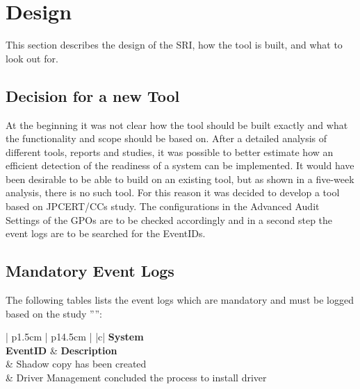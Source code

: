 \section{Design}
This section describes the design of the SRI, how the tool is built, and what to look out for.
\subsection{Decision for a new Tool}
At the beginning it was not clear how the tool should be built exactly and what the functionality and scope should be based on. After a detailed analysis of different tools, reports and studies, it was possible to better estimate how an efficient detection of the readiness of a system can be implemented. It would have been desirable to be able to build on an existing tool, but as shown in a five-week analysis, there is no such tool. For this reason it was decided to develop a tool based on JPCERT/CCs study. The configurations in the Advanced Audit Settings of the GPOs are to be checked accordingly and in a second step the event logs are to be searched for the EventIDs.

\subsection{Mandatory Event Logs}\label{MandatoryLogs}
The following tables lists the event logs which are mandatory and must be logged based on the study '''':
\
\vspace{0.5cm}
\begin{table}[H]
    \centering
    \begin{tabular}{| p{1.5cm} | p{14.5cm} |} \hline
         {|c|} {\tiny\bfseries System} \\ \hline
        \textbf{EventID} & \textbf{Description}  \\ \footnotemark[2] & Shadow copy has been created \\ \hline
        20001\footnotemark[2] & Driver Management concluded the process to install driver  \\ \hline
    \end{tabular}
    \caption{Mandatory System Event Logs}
\end{table}


